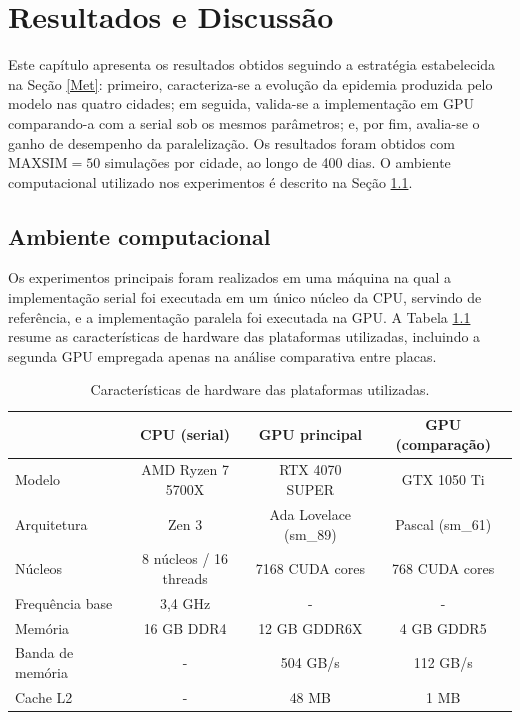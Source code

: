 \chapter{Resultados e Discussão}
\label{cap:resultados}

Este capítulo apresenta os resultados obtidos seguindo a estratégia estabelecida na Seção \ref{Met}: primeiro, caracteriza-se a evolução da epidemia produzida pelo modelo nas quatro cidades; em seguida, valida-se a implementação em GPU comparando-a com a serial sob os mesmos parâmetros; e, por fim, avalia-se o ganho de desempenho da paralelização. Os resultados foram obtidos com $\text{MAXSIM} = 50$ simulações por cidade, ao longo de 400 dias. O ambiente computacional utilizado nos experimentos é descrito na Seção \ref{sec:ambiente}.

\section{Ambiente computacional}
\label{sec:ambiente}

Os experimentos principais foram realizados em uma máquina na qual a implementação serial foi executada em um único núcleo da CPU, servindo de referência, e a implementação paralela foi executada na GPU. A Tabela \ref{tab:hardware} resume as características de hardware das plataformas utilizadas, incluindo a segunda GPU empregada apenas na análise comparativa entre placas.

\begin{table}[H]
\centering
\caption{Características de hardware das plataformas utilizadas.}
\label{tab:hardware}
\begin{tabular}{l c c c}
\hline
 & \textbf{CPU (serial)} & \textbf{GPU principal} & \textbf{GPU (comparação)} \\
\hline
Modelo            & AMD Ryzen 7 5700X      & RTX 4070 SUPER        & GTX 1050 Ti \\
Arquitetura       & Zen 3                  & Ada Lovelace (sm\_89) & Pascal (sm\_61) \\
Núcleos           & 8 núcleos / 16 threads & 7168 CUDA cores       & 768 CUDA cores \\
Frequência base   & 3,4 GHz                & -                   & - \\
Memória           & 16 GB DDR4             & 12 GB GDDR6X          & 4 GB GDDR5 \\
Banda de memória  & -                    & 504 GB/s              & 112 GB/s \\
Cache L2          & -                    & 48 MB                 & 1 MB \\
\hline
\end{tabular}
\end{table}

